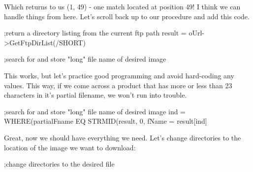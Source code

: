 \documentclass{book}
\newcommand{\codefill}{\centering$\longrightarrow$\hfill{\color{gray}\rule[0.1\baselineskip]{0.5\linewidth}{2pt}}\hfill$\longleftarrow$}
\newcounter{highlight}[page]
\newcommand{\tikzhighlightanchor}[1]{\ensuremath{\vcenter{\hbox{\tikz[remember picture, overlay]{\coordinate (#1 highlight \arabic{highlight});}}}}}
\newcommand{\bh}[0]{\stepcounter{highlight}\tikzhighlightanchor{begin}}
\newcommand{\eh}[0]{\tikzhighlightanchor{end}}
\theoremstyle{aside_style}
\begin{document}

Which returns to us (1, 49) - one match located at position 49!
I think we can handle things from here. Let's scroll back up to our procedure and add this code.

\begin{idl}
;return a directory listing from the current ftp path
result = oUrl->GetFtpDirList(/SHORT)

;search for and store "long" file name of desired image
\end{idl}

This works, but let's practice good programming and avoid hard-coding any values.
This way, if we come across a product that has more or less than 23 characters in it's partial filename, we won't run into trouble.

\begin{idl}
;search for and store "long" file name of desired image
ind = WHERE(partialFname EQ STRMID(result, 0, %
fName = result[ind]
\end{idl}

Great, now we should have everything we need.
Let's change directories to the location of the image we want to download:

\begin{idl}
;change directories to the desired file
\end{idl}
\end{document}
